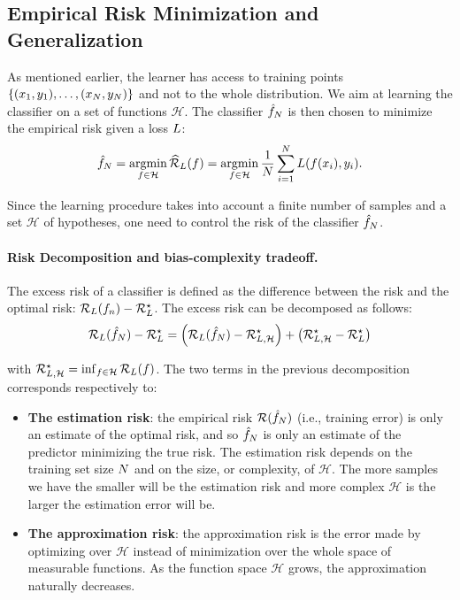 \subsection{Empirical Risk Minimization and Generalization}
\label{sec:erm-results}
As mentioned earlier, the learner has access to training points  $\{(x_1,y_1),\dots,(x_N,y_N)\}$ and not to the whole distribution. We aim at learning the classifier on a set of functions $\mathcal{H}$. The classifier $\hat{f}_N $ is then chosen to minimize the empirical risk given a loss $L$:
\begin{align*}
    \hat{f}_N = \operatorname*{argmin}_{f\in\mathcal{H}}\widehat{\mathcal{R}}_{L}(f)= \operatorname*{argmin}_{f\in\mathcal{H}}\frac{1}{N}\sum_{i=1}^N L(f(x_i),y_i).
\end{align*}

Since the learning procedure takes into account a finite number of samples and a set $\mathcal{H}$ of hypotheses, one need to control the risk of the classifier $\hat{f}_N$.

\paragraph*{Risk Decomposition and bias-complexity tradeoff.} The excess risk of a classifier is defined as the difference between the risk and the optimal risk: $\mathcal{R}_L(f_n) - \mathcal{R}_L^\star$. The excess risk can be decomposed as follows:
\begin{align*}
    \risk_\loss( \hat{f}_\numsamples) - \risk_\loss^\star = \left(\risk_\loss( \hat{f}_\numsamples) - \risk_{\loss,\mathcal{H}}^\star\right)+ \left(\risk_{\loss,\mathcal{H}}^\star - \risk_\loss^\star\right)
\end{align*}

with $\mathcal{R}_{L,\mathcal{H}}^\star = \inf_{f\in\mathcal{H}}\mathcal{R}_L(f)$. The two terms in the previous decomposition corresponds respectively to:
\begin{itemize}
    \item \textbf{The estimation risk}:  the empirical risk $\mathcal{R}(\hat{f}_N)$ (i.e., training error) is only an estimate of the optimal risk, and so $\hat{f}_N$   is only an estimate of the predictor minimizing the true risk. The estimation risk depends on the training set size $N$ and on the size, or complexity, of  $\mathcal{H}$.  The more samples we have the smaller will be the estimation risk and more complex $\mathcal{H}$ is the larger the estimation error will be.
    \item \textbf{The approximation risk}: the approximation risk is the error made by optimizing over $\mathcal{H}$ instead of minimization over the whole space of measurable functions. As  the function space $\mathcal{H}$ grows, the approximation naturally decreases. 
\end{itemize}

